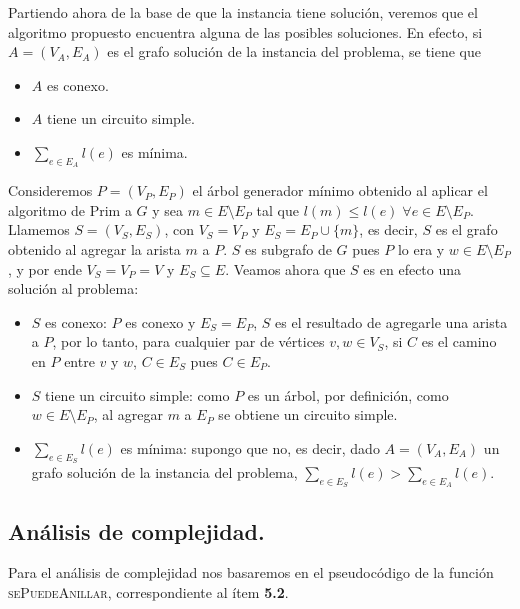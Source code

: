 Partiendo ahora de la base de que la instancia tiene solución, veremos
que el algoritmo propuesto encuentra alguna de las posibles soluciones. En
efecto, si $A = (V_A, E_A)$ es el grafo solución de la instancia del
problema, se tiene que

\begin{itemize}
  \item $A$ es conexo.
  \item $A$ tiene un circuito simple.
  \item $\sum\limits_{e \in E_A} l(e)$ es mínima.
\end{itemize}

Consideremos $P = (V_P, E_P)$ el árbol generador mínimo obtenido al aplicar
el algoritmo de Prim a $G$ y sea $m \in E \setminus E_P$ tal que $l(m) \leq
l(e) \; \forall e \in E \setminus E_P$. Llamemos $S = (V_S, E_S)$, con $V_S
= V_P$ y $E_S = E_P \cup \{m\}$, es decir, $S$ es el grafo obtenido al
agregar la arista $m$ a $P$. $S$ es subgrafo de $G$ pues $P$ lo era y $w \in
E \setminus E_P$, y por ende $V_S = V_P = V$ y $E_S \subseteq E$. Veamos
ahora que $S$ es en efecto una solución al problema:

\begin{itemize}
  \item $S$ es conexo: $P$ es conexo y $E_S = E_P$, $S$ es el resultado de
  agregarle una arista a $P$, por lo tanto, para cualquier par de vértices
  $v, w \in V_S$, si $C$ es el camino en $P$ entre $v$ y $w$, $C \in E_S$
  pues $C \in E_P$.
  \item $S$ tiene un circuito simple: como $P$ es un árbol, por definición,
  como $w \in E \setminus E_P$, al agregar $m$ a $E_P$ se obtiene un
  circuito simple.
  \item $\sum\limits_{e \in E_S} l(e)$ es mínima: supongo que no, es decir,
  dado $A = (V_A, E_A)$ un grafo solución de la instancia del problema,
  $\sum\limits_{e \in E_S} l(e) > \sum\limits_{e \in E_A} l(e)$.
\end{itemize}


\newpage
\subsection{Análisis de complejidad.}

\vspace*{0.3cm}

Para el análisis de complejidad nos basaremos en el pseudocódigo de la función
\textsc{sePuedeAnillar}, correspondiente al ítem \textbf{5.2}.

